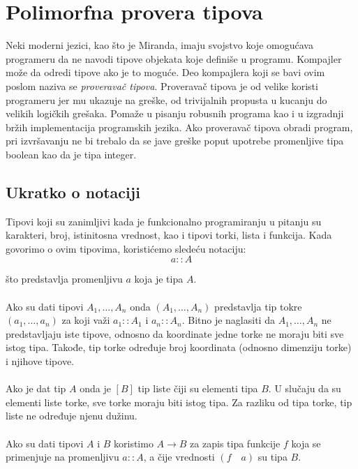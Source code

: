 \section{Polimorfna provera tipova}
\label{sec:provera tipova}


Neki moderni jezici, kao što je Miranda, imaju svojstvo koje omogućava programeru da ne navodi tipove objekata koje definiše u programu. Kompajler može da odredi tipove ako je to moguće. Deo kompajlera koji se bavi ovim poslom naziva se \textit{proveravač tipova}. Proveravač tipova je od velike koristi programeru jer mu ukazuje na greške, od trivijalnih propusta u kucanju do velikih logičkih grešaka. Pomaže u pisanju robusnih programa kao i u izgradnji bržih implementacija programskih jezika. Ako proveravač tipova obradi program, pri izvršavanju ne bi trebalo da se jave greške poput upotrebe promenljive tipa boolean kao da je tipa integer.

\iffalse
\subsection{Ukratko o notaciji}
Tipovi koji su zanimljivi kada je funkcionalno programiranju u pitanju su karakteri, broj, istinitosna vrednost, kao i tipovi torki, lista i funkcija. Kada govorimo o ovim tipovima, koristićemo sledeću notaciju:
$$a::A$$

\noindent što predstavlja promenljivu $a$ koja je tipa $A$. 	
\\
\\ Ako su dati tipovi $A_1, \ldots, A_n$ onda $(A_1, \ldots, A_n)$ predstavlja tip tokre $(a_1, \ldots, a_n)$ za koji važi $a_1::A_1$ i $a_n::A_n$. Bitno je naglasiti da $A_1, \ldots, A_n$ ne predstavljaju iste tipove, odnosno da koordinate jedne torke ne moraju biti sve istog tipa. Takođe, tip torke određuje broj koordinata (odnosno dimenziju torke) i njihove tipove. 
\\
\\ Ako je dat tip $A$ onda je $[B]$ tip liste čiji su elementi tipa $B$. U slučaju da su elementi liste torke, sve torke moraju biti istog tipa. Za razliku od tipa torke, tip liste ne određuje njenu dužinu. 
\\
\\ Ako su dati tipovi $A$ i $B$ koristimo $A \longrightarrow B$ za zapis tipa funkcije $f$ koja se primenjuje na promenljivu $a::A$, a čije vrednosti $(f \quad a)$ su tipa $B$.


